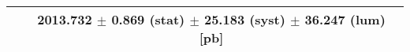 \begin{tabular}{lc}
\hline
                               & 2013.732 $\pm$ 0.869 (stat) $\pm$ 25.183 (syst) $\pm$ 36.247 (lum) [pb]  \\
\hline
\end{tabular}
